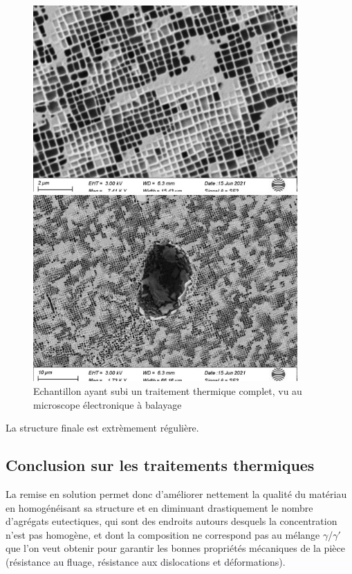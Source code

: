 \begin{figure}[htbp]
    \centering
    \begin{minipage}{0.45\textwidth}
        \includegraphics[width=0.9\textwidth]{images_meb/TTH1914.pdf}
    \end{minipage}%
    \begin{minipage}{0.45\textwidth}
        \includegraphics[width=0.9\textwidth]{images_meb/TTH1915.pdf}
    \end{minipage}%
    \caption{Echantillon ayant subi un traitement thermique complet, 
    vu au microscope électronique à balayage}
    \label{fig:complet_MEB}
\end{figure}

La structure finale est extrèmement régulière.\\

\subsection*{Conclusion sur les traitements thermiques}

La remise en solution permet donc d'améliorer nettement la qualité du matériau en
homogénéisant sa structure et en diminuant drastiquement le nombre d'agrégats
eutectiques, qui sont des endroits autours desquels la concentration n'est pas 
homogène, et dont la composition ne correspond pas au mélange $\gamma$/$\gamma'$
que l'on veut obtenir pour garantir les bonnes propriétés mécaniques de la pièce 
(résistance au fluage, résistance aux dislocations et déformations).



